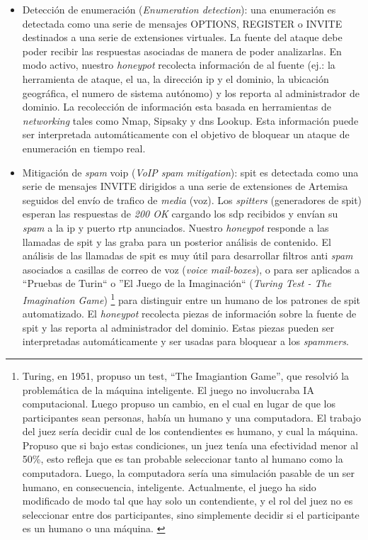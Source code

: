 \documentclass[a4paper,12pt]{report}
\begin{document}
\begin{itemize}

\item Detección de enumeración (\emph{Enumeration detection}):
una enumeración es detectada como una serie de mensajes OPTIONS, REGISTER o
INVITE destinados a una serie de extensiones virtuales. La fuente del ataque
debe poder recibir las respuestas asociadas de manera de poder analizarlas. En
modo activo, nuestro \emph{honeypot} recolecta información de al fuente (ej.: la
herramienta de ataque, el \ac{ua}, la dirección \ac{ip} y el dominio, la
ubicación geográfica, el numero de sistema autónomo) y los reporta al
administrador de dominio. La recolección de información esta basada en
herramientas de \emph{networking} tales como Nmap, Sipsaky y \ac{dns} Lookup. 
Esta información puede ser interpretada automáticamente con el objetivo
de bloquear un ataque de enumeración en tiempo real.

\item Mitigación de \emph{spam} \ac{voip} (\emph{VoIP spam mitigation}):
\ac{spit} es detectada como una serie de mensajes INVITE dirigidos a una serie de
extensiones de Artemisa seguidos del envío de trafico de \emph{media} (voz). Los
\emph{spitters} (generadores de \ac{spit}) esperan las respuestas de \emph{200 OK} cargando
los \ac{sdp} recibidos y envían su \emph{spam} a la \ac{ip} y puerto \ac{rtp} anunciados. Nuestro
\emph{honeypot} responde a las llamadas de \ac{spit} y las graba para un posterior análisis
de contenido. El análisis de las llamadas de \ac{spit} es muy útil para desarrollar
filtros anti \emph{spam} asociados a casillas de correo de voz (\emph{voice
mail-boxes}), o para ser aplicados a ``Pruebas de Turin`` o ''El Juego de la
Imaginación`` (\emph{Turing Test - The Imagination Game}) \footnote{Turing, en
1951, propuso un test, ``The Imagiantion Game'', que resolvió la
problemática de la máquina inteligente. El juego no
involucraba IA computacional. Luego propuso un cambio, en el cual en lugar de
que los participantes sean personas, había un humano y una computadora. El
trabajo del juez sería decidir cual de los contendientes es humano, y cual la
máquina. Propuso que si bajo estas condiciones, un juez tenía una efectividad
menor al 50\%, esto refleja que es tan probable seleccionar tanto al humano como
la computadora. Luego, la computadora sería una simulación pasable de un
ser humano, en consecuencia, inteligente. Actualmente, el juego ha sido 
modificado de modo tal que hay solo un contendiente, y el rol del juez no es
seleccionar entre dos participantes, sino simplemente decidir si el participante
es un humano o una máquina. \cite{reingold}} para distinguir
entre un humano de los patrones de \ac{spit} automatizado. El \emph{honeypot} recolecta
piezas de información sobre la fuente de \ac{spit} y las reporta al administrador
del dominio. Estas piezas pueden ser interpretadas automáticamente y ser usadas
para bloquear a los \emph{spammers}. 


\end{itemize}
\end{document}
